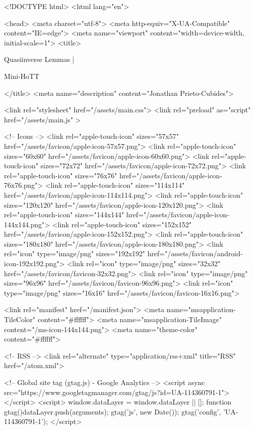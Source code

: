 <!DOCTYPE html>
<html lang="en">

<head>
  <meta charset="utf-8">
  <meta http-equiv="X-UA-Compatible" content="IE=edge">
  <meta name="viewport" content="width=device-width, initial-scale=1">
  <title>
    
      
        Quasiinverse Lemmas |
      
        Mini-HoTT
    
  </title>
  <meta name="description" content="Jonathan Prieto-Cubides">

  <link rel="stylesheet" href="/assets/main.css">
  <link rel="preload" as="script" href="/assets/main.js" >

  <!-- Icons -->
  <link rel="apple-touch-icon" sizes="57x57" href="/assets/favicon/apple-icon-57x57.png">
  <link rel="apple-touch-icon" sizes="60x60" href="/assets/favicon/apple-icon-60x60.png">
  <link rel="apple-touch-icon" sizes="72x72" href="/assets/favicon/apple-icon-72x72.png">
  <link rel="apple-touch-icon" sizes="76x76" href="/assets/favicon/apple-icon-76x76.png">
  <link rel="apple-touch-icon" sizes="114x114" href="/assets/favicon/apple-icon-114x114.png">
  <link rel="apple-touch-icon" sizes="120x120" href="/assets/favicon/apple-icon-120x120.png">
  <link rel="apple-touch-icon" sizes="144x144" href="/assets/favicon/apple-icon-144x144.png">
  <link rel="apple-touch-icon" sizes="152x152" href="/assets/favicon/apple-icon-152x152.png">
  <link rel="apple-touch-icon" sizes="180x180" href="/assets/favicon/apple-icon-180x180.png">
  <link rel="icon" type="image/png" sizes="192x192"  href="/assets/favicon/android-icon-192x192.png">
  <link rel="icon" type="image/png" sizes="32x32" href="/assets/favicon/favicon-32x32.png">
  <link rel="icon" type="image/png" sizes="96x96" href="/assets/favicon/favicon-96x96.png">
  <link rel="icon" type="image/png" sizes="16x16" href="/assets/favicon/favicon-16x16.png">

  <link rel="manifest" href="/manifest.json">
  <meta name="msapplication-TileColor" content="#ffffff">
  <meta name="msapplication-TileImage" content="/ms-icon-144x144.png">
  <meta name="theme-color" content="#ffffff">

  <!-- RSS -->
  <link rel="alternate" type="application/rss+xml" title="RSS" href="/atom.xml">

  <!-- Global site tag (gtag.js) - Google Analytics -->
  <script async src="https://www.googletagmanager.com/gtag/js?id=UA-114360791-1"></script>
  <script>
    window.dataLayer = window.dataLayer || [];
    function gtag(){dataLayer.push(arguments);}
    gtag('js', new Date());
    gtag('config', 'UA-114360791-1');
  </script>

